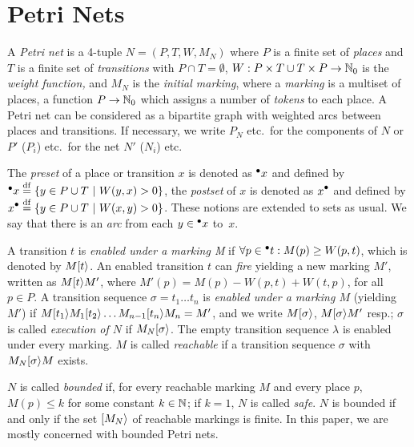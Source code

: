\section{Petri Nets}\label{sec_pn_basic}

A \emph{Petri net} is a 4-tuple $N=(P,T,W,M_N)$ where
$P$ is a finite set of \emph{places} and $T$ is a finite set of \emph{transitions}
with $P \cap T=\emptyset$,
$W: P\times T \cup T \times P \rightarrow \mathbb{N}_0$ is the \emph{weight function,} and
$M_N$ is the \emph{initial marking}, where a \emph{marking} is a multiset of places,
\ie a function $P\rightarrow\mathbb{N}_0$ which assigns a number of \emph{tokens} to each place.
A Petri net can be considered as a bipartite graph with weighted arcs between places and transitions.
If necessary, we write $P_N$ etc.\ for the components of $N$ or $P'$ ($P_i$) etc.\ for the net $N'$ ($N_i$) etc.



The \emph{preset} of a place or transition $x$ is denoted as ${}^\bullet {x}$ and defined by
$\pre x\DEF\{y\in P\cup T\ |\  W(y,x)>0\}$,
the \emph{postset} of $x$ is denoted as $\post x$ and defined by
$\post x\DEF\{y\in P\cup T\ |\ W(x,y)>0\}$.
These notions are extended to sets as usual.
We say that there is an \emph{arc}
from each $y\in {}^\bullet {x}$ to~$x$.





A transition $t$ is \emph{enabled under a marking M}
if $\forall p\in {}^\bullet {t}:M(p)\geq W(p, t)$, which is denoted by $M[t\rangle$.
An enabled transition $t$ can \emph{fire} yielding a new marking $M'$,
written as $M[t\rangle M'$,
where $M'(p)=M(p)-W(p, t) + W(t,p)$, for all $p\in P$.
A transition sequence $\sigma=t_1\ldots t_n$ is \emph{enabled under a marking $M$} (yielding $M'$)
if $M[t_1\rangle M_1[t_2\rangle\ldots M_{n-1}[t_n\rangle M_n=M'$, and we
write $M[\sigma\rangle$, $M[\sigma\rangle M'$ resp.; $\sigma$ is called \emph{execution of $N$} if $M_N[\sigma\rangle$.
  The empty transition sequence $\lambda$ is  enabled under every marking.
$M$ is called \emph{reachable} if a transition sequence $\sigma$ with
$M_N[\sigma\rangle M$ exists.

$N$ is called \emph{bounded} if, for every reachable marking $M$ and every place $p$, $M(p)\leq k$ for some constant $k\in \mathbb{N}$; if $k=1$, $N$ is called \emph{safe}. $N$ is bounded if and only if the set $[M_N\rangle$ of reachable markings is finite. In this paper, we are mostly concerned with bounded Petri nets.

